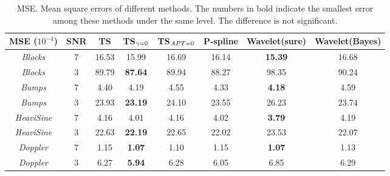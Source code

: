  \begin{table}
 	\centering
 	\caption{MSE. Mean square errors of different methods. The numbers in bold indicate the smallest error among these methods under the same level. The difference is not significant.}\label{mse3200}
	\setlength\tabcolsep{1.5pt}
	\begin{tabular}{|c|c|c|c|c|c|c|c|}
\hline	MSE ($10^{-4}$)   & SNR & TS & TS$_{\footnotesize\gamma=0}$ & TS$_{\footnotesize APT=0}$  & P-spline & Wavelet(sure)& Wavelet(Bayes)\\ \hline
\textit{Blocks}    & 7   &  16.53& 15.99 & 16.69 & 16.14  & \textbf{15.39} & 16.68 \\ \hline
\textit{Blocks}    & 3   &  89.79 & \textbf{87.64} & 89.94  & 88.27 & 98.35 & 90.24 \\ \hline
\textit{Bumps}     & 7   & 4.40 & 4.19 & 4.55 & 4.33 & \textbf{4.18} & 4.59 \\ \hline
\textit{Bumps}     & 3   & 23.93 & \textbf{23.19} & 24.10 & 23.55 & 26.23 & 23.74 \\ \hline
\textit{HeaviSine} & 7   & 4.16 & 4.01 &4.16 & 4.02 & \textbf{3.79} & 4.19 \\ \hline
\textit{HeaviSine} & 3   & 22.63 & \textbf{22.19} & 22.65 & 22.02 & 23.53 & 22.07 \\ \hline
\textit{Doppler}   & 7   & 1.15 & \textbf{1.07} & 1.10 & 1.15  & \textbf{1.07} & 1.13  \\ \hline
\textit{Doppler}   & 3   & 6.27 & \textbf{5.94} &6.28 & 6.05  & 6.85 & 6.29  \\ \hline
	\end{tabular}
\end{table}

